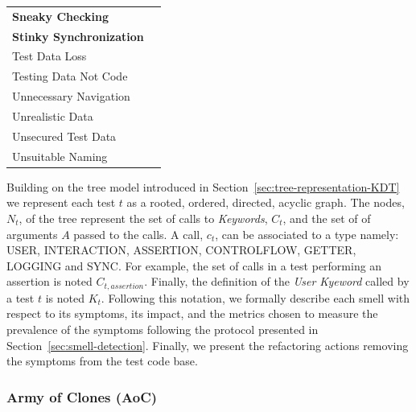 \begin{table}
\begin{tabular}{>{\raggedright}p{1.5in}>{\raggedright}p{4in}}
\scriptsize{\textbf{Sneaky Checking}} & \scriptsize{\cite{Kirkbride2014, Buwalda2015, Renaudin2016}} \tabularnewline

\scriptsize{\textbf{Stinky Synchronization}} & \scriptsize{\cite{Gawinecki2016, Renaudin2016, Bushnev2019, Jones2019, Sheth2020}} \tabularnewline 

\scriptsize{Test Data Loss} & \scriptsize{\cite{Siminiuc2019}} \tabularnewline

\scriptsize{Testing Data Not Code} & \scriptsize{\cite{Dharmender2017}} \tabularnewline 

\scriptsize{Unnecessary Navigation} & \scriptsize{\cite{Archer2010}} \tabularnewline 

\scriptsize{Unrealistic Data} & \scriptsize{\cite{Goldberg2019}} \tabularnewline 

\scriptsize{Unsecured Test Data} & \scriptsize{\cite{Morlion2019}} \tabularnewline

\scriptsize{Unsuitable Naming} & \scriptsize{\cite{Chen2012, Goldberg2019, Shay2019, Sheth2020}} \tabularnewline

\bottomrule
\end{tabular}

\end{table}

Building on the tree model introduced in Section~\ref{sec:tree-representation-KDT} we represent each test $t$ as a rooted, ordered, directed, acyclic graph. The nodes, $N_t$, of the tree represent the set of calls to \emph{Keywords}, $C_t$, and the set of of arguments $A$ passed to the calls. A call, $c_t$, can be associated to a type namely: USER, INTERACTION, ASSERTION, CONTROLFLOW, GETTER, LOGGING and SYNC. For example, the set of calls in a test performing an assertion is noted $C_{t, assertion}$. Finally, the definition of the \emph{User Kyeword} called by a test $t$ is noted $K_t$. Following this notation, we formally describe each smell with respect to its symptoms, its impact, and the metrics chosen to measure the prevalence of the symptoms following the protocol presented in Section~\ref{sec:smell-detection}. Finally, we present the refactoring actions removing the symptoms from the test code base.

\subsubsection{Army of Clones (AoC)}

